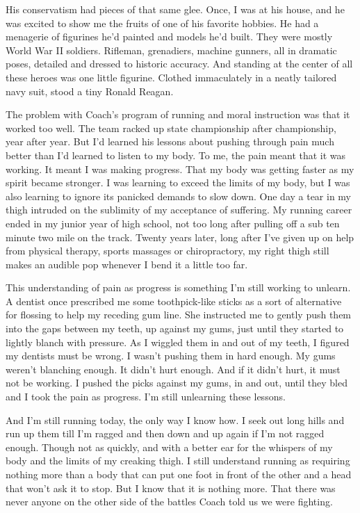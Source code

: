 \documentclass[12pt, oneside]{memoir}
\begin{document}
His conservatism had pieces of that same glee.
Once, I was at his house, and he was excited to show me the fruits of
one of his favorite hobbies.
He had a menagerie of figurines he'd painted and models he'd built.
They were mostly World War II soldiers.
Rifleman, grenadiers, machine gunners, all in dramatic poses, detailed
and dressed to historic accuracy.
And standing at the center of all these heroes was one little figurine.
Clothed immaculately in a neatly tailored navy suit, stood a tiny
Ronald Reagan. 

The problem with Coach's program of running and moral instruction was
that it worked too well.
The team racked up state championship after championship, year after
year.
But I'd learned his lessons about pushing through pain much better
than I'd learned to listen to my body.
To me, the pain meant that it was working.
It meant I was making progress.
That my body was getting faster as my spirit became stronger.
I was learning to exceed the limits of my body, but I was also
learning to ignore its panicked demands to slow down.
One day a tear in my thigh intruded on the sublimity of my acceptance
of suffering.
My running career ended in my junior year of high school, not too long
after pulling off a sub ten minute two mile on the track.
Twenty years later, long after I've given up on help from physical
therapy, sports massages or chiropractory, my right thigh still makes
an audible pop whenever I bend it a little too far.

This understanding of pain as progress is something I'm still working
to unlearn.
A dentist once prescribed me some toothpick-like sticks as a sort of
alternative for flossing to help my receding gum line.
She instructed me to gently push them into the gaps between my teeth,
up against my gums, just until they started to lightly blanch with
pressure.
As I wiggled them in and out of my teeth, I figured my dentists must
be wrong.
I wasn't pushing them in hard enough.
My gums weren't blanching enough.
It didn't hurt enough.
And if it didn't hurt, it must not be working.
I pushed the picks against my gums, in and out, until they bled and I
took the pain as progress.
I'm still unlearning these lessons.

And I'm still running today, the only way I know how.
I seek out long hills and run up them till I'm ragged and then
down and up again if I'm not ragged enough.
Though not as quickly, and with a better ear for the whispers of my
body and the limits of my creaking thigh.
I still understand running as requiring nothing more than a body that
can put one foot in front of the other and a head that won’t ask it to
stop.
But I know that it is nothing more.
That there was never anyone on the other side of the battles Coach
told us we were fighting.
\end{document}
